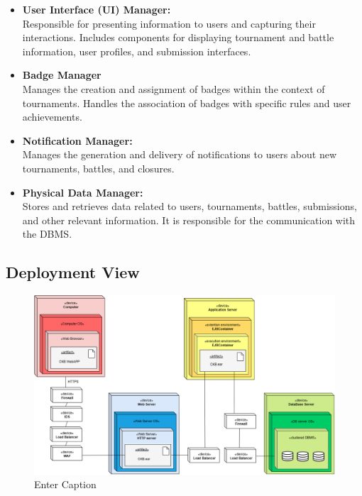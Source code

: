 \begin{itemize}
\item \textbf{User Interface (UI) Manager:} \\
    Responsible for presenting information to users and capturing their interactions. Includes components for displaying tournament and battle information, user profiles, and submission interfaces.

\item \textbf{Badge Manager} \\
Manages the creation and assignment of badges within the context of tournaments.
Handles the association of badges with specific rules and user achievements.

\item \textbf{Notification Manager:} \\
Manages the generation and delivery of notifications to users about new tournaments, battles, and closures.

\item \textbf{Physical Data Manager:} \\
Stores and retrieves data related to users, tournaments, battles, submissions, and other relevant information. It is responsible for the communication with the DBMS.
\end{itemize}


\subsection {Deployment View}

\begin{figure}[H]
    \centering
    \includegraphics[width=1\linewidth]{Images/DeploymentView.png}
    \caption{Enter Caption}
    \label{fig:enter-label}
\end{figure}

